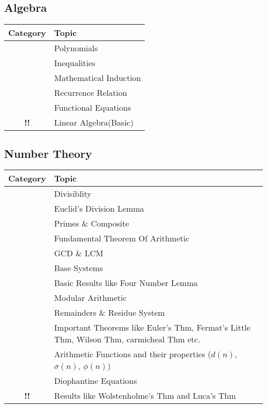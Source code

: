 \documentclass[11pt]{scrartcl}
\providecommand{\isRq}{{\color{green!60!black}\CheckmarkBold}}
\providecommand{\isAv}{{\color{gray}\sffamily\bfseries !!}}
\providecommand{\isEx}{{\color{red}\sffamily\bfseries X}}
\begin{document}
\begin{center}
\begin{tabular}{cp{12cm}}
  \bottomrule
  \end{tabular}
\end{center}


\subsection{Algebra}
\begin{center}
  \begin{tabular}{cp{12cm}}
  \toprule Category & Topic \\ \midrule
  \isRq & Polynomials\\
  \isRq & Inequalities\\
  \isRq & Mathematical Induction\\
  \isRq & Recurrence Relation\\
  \isRq & Functional Equations\\
  \isAv & Linear Algebra(Basic)\\
\bottomrule
\end{tabular}
\end{center}
\subsection{Number Theory}
\begin{center}
  \begin{tabular}{cp{12cm}}
  \toprule Category & Topic \\ \midrule
  \isRq & Divisiblity\\
  \isRq & Euclid's Division Lemma\\
  \isRq & Primes \& Composite\\
  \isRq & Fundamental Theorem Of Arithmetic\\
  \isRq & GCD \& LCM\\
  \isRq & Base Systems\\
  \isRq & Basic Results like Four Number Lemma\\
  \isRq & Modular Arithmetic\\
  \isRq & Remainders \& Residue System\\
  \isRq & Important Theorems like Euler's Thm, Fermat's Little Thm, Wilson Thm, carmicheal Thm etc.\\
  \isRq & Arithmetic Functions and their properties ($d(n)$, $\sigma(n)$, $\phi(n)$)\\
  \isRq & Diophantine Equations\\
  \isAv & Results like Wolstenholme's Thm and Luca's Thm\\
  \bottomrule
\end{tabular}
\end{center}
  
\end{document}
